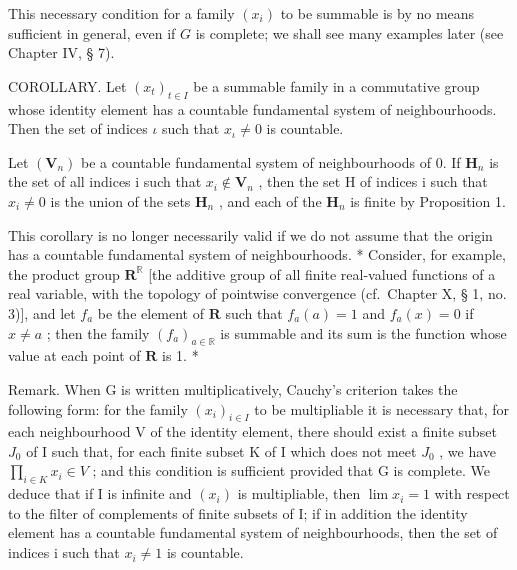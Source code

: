 This necessary condition for a family \((x_{i})\) to be summable is by no means sufficient in general, even if \(G\) is complete; we shall see many examples later (see Chapter IV, § 7).

COROLLARY. Let \((x_{t})_{t\in I}\) be a summable family in a commutative group whose identity element has a countable fundamental system of neighbourhoods. Then the set of indices \(\iota\) such that \(x_{\iota}\neq 0\) is countable.

Let \((\mathbf{V}_{n})\) be a countable fundamental system of neighbourhoods of 0. If \(\mathbf{H}_{n}\) is the set of all indices i such that \(x_{i} \notin \mathbf{V}_{n}\) , then the set H of indices i such that \(x_{i} \neq 0\) is the union of the sets \(\mathbf{H}_{n}\) , and each of the \(\mathbf{H}_{n}\) is finite by Proposition 1.

This corollary is no longer necessarily valid if we do not assume that the origin has a countable fundamental system of neighbourhoods. * Consider, for example, the product group \(\mathbf{R}^{\mathbb{R}}\) {[}the additive group of all finite real-valued functions of a real variable, with the topology of pointwise convergence (cf.~Chapter X, § 1, no. 3){]}, and let \(f_{a}\) be the element of \(\mathbf{R}\) such that \(f_{a}(a)=1\) and \(f_{a}(x)=0\) if \(x\neq a\) ; then the family \((f_{a})_{a\in\mathbb{R}}\) is summable and its sum is the function whose value at each point of \(\mathbf{R}\) is 1. *

Remark. When G is written multiplicatively, Cauchy's criterion takes the following form: for the family \((x_{i})_{i\in I}\) to be multipliable it is necessary that, for each neighbourhood V of the identity element, there should exist a finite subset \(J_{0}\) of I such that, for each finite subset K of I which does not meet \(J_{0}\) , we have \(\prod_{i\in K}x_{i}\in V\) ; and this condition is sufficient provided that G is complete. We deduce that if I is infinite and \((x_{i})\) is multipliable, then \(\lim x_{i}=1\) with respect to the filter of complements of finite subsets of I; if in addition the identity element has a countable fundamental system of neighbourhoods, then the set of indices i such that \(x_{i}\neq1\) is countable.


